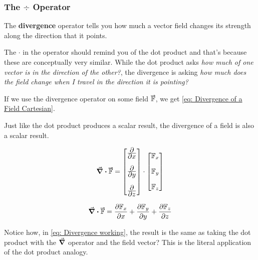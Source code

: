 \documentclass[main.tex]{subfiles}
\begin{document}
                \subsubsection{The $\div{}$ Operator}
                    \label{subsubsec: The Divergence Operator}

                    The \textbf{divergence} operator tells you how much a vector field changes its strength along the direction that it points.

                    The $\cdot$ in the operator should remind you of the dot product and that's because these are conceptually very similar. While the dot product asks \textit{how much of one vector is in the direction of the other?}, the divergence is asking \textit{how much does the field change when I travel in the direction it is pointing?}

                    If we use the divergence operator on some field $\vect{\mathbb{F}}$, we get \eqref{eq: Divergence of a Field Cartesian}.
                    
                    Just like the dot product produces a scalar result, the divergence of a field is also a scalar result.

                    \begin{equation}
                        \div{\vect{\mathbb{F}}} = \Matrix{\bfrac{\partial}{\partial x} \vspace{1em}\\\bfrac{\partial}{\partial y} \vspace{1em}\\\bfrac{\partial}{\partial z}} \cdot \Matrix{\mathbb{F}_x\\[1em] \mathbb{F}_y\\[1em] \mathbb{F}_z}
                        \label{eq: Divergence working}
                    \end{equation}

                    \begin{equation}
                        \div{\vect{\mathbb{F}}} = \bfrac{\partial \mathbb{F}_x}{\partial x} + \bfrac{\partial \mathbb{F}_y}{\partial y} + \bfrac{\partial \mathbb{F}_z}{\partial z}
                        \label{eq: Divergence of a Field Cartesian}
                    \end{equation}

                    Notice how, in \eqref{eq: Divergence working}, the result is the same as taking the dot product with the $\grad{}$ operator and the field vector? This is the literal application of the dot product analogy.
\end{document}
